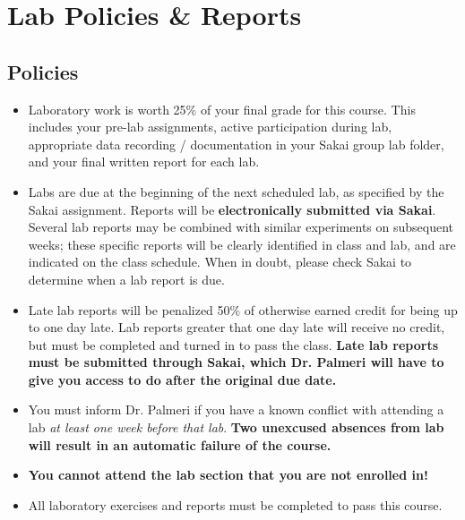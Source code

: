 \section{Lab Policies \& Reports}
\subsection{Policies}
\begin{itemize}
    \item Laboratory work is worth 25\% of your final grade for this course.
        This includes your pre-lab assignments, active participation during
        lab, appropriate data recording / documentation in your Sakai group lab
        folder, and your final written report for each lab.

    \item Labs are due at the beginning of the next scheduled lab, as specified
        by the Sakai assignment. Reports will be \textbf{electronically
            submitted via Sakai}.  Several lab reports may be combined with
        similar experiments on subsequent weeks; these specific reports will be
        clearly identified in class and lab, and are indicated on the class
        schedule.  When in doubt, please check Sakai to determine when a lab
        report is due.

    \item Late lab reports will be penalized 50\% of otherwise earned credit
        for being up to one day late.  Lab reports greater that one day late
        will receive no credit, but must be completed and turned in to pass the
        class.  {\bf Late lab reports must be submitted through Sakai, which
            Dr. Palmeri will have to give you access to do after the original
            due date.}

    \item You must inform Dr. Palmeri if you have a known conflict with
        attending a lab \emph{at least one week before that lab}.  \textbf{Two
            unexcused absences from lab will result in an automatic failure of
            the course.}

    \item \textbf{You cannot attend the lab section that you are not enrolled in!}

    \item All laboratory exercises and reports must be completed to pass this
        course.
\end{itemize}

